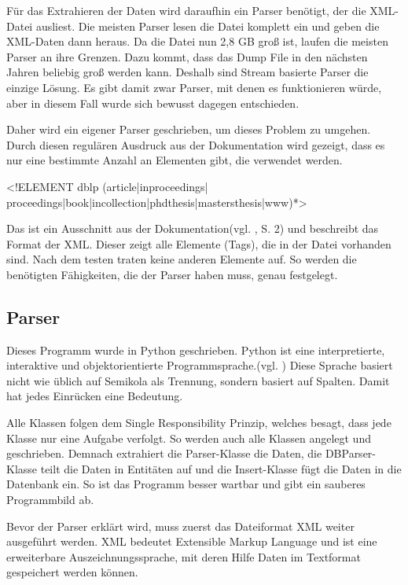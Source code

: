 Für das Extrahieren der Daten wird daraufhin ein Parser benötigt, der die XML-Datei ausliest. Die meisten Parser lesen die Datei komplett ein und geben die XML-Daten dann heraus. Da die Datei nun 2,8 GB groß ist, laufen die meisten Parser an ihre Grenzen. Dazu kommt, dass das Dump File in den nächsten Jahren beliebig groß werden kann. Deshalb sind Stream basierte Parser die einzige Lösung. Es gibt damit zwar Parser, mit denen es funktionieren würde, aber in diesem Fall wurde sich bewusst dagegen entschieden. 

Daher wird ein eigener Parser geschrieben, um dieses Problem zu umgehen. Durch diesen regulären Ausdruck aus der Dokumentation wird gezeigt, dass es nur eine bestimmte Anzahl an Elementen gibt, die verwendet werden. 

\begin{center}
	<!ELEMENT dblp (article|inproceedings| proceedings|book|incollection|phdthesis|mastersthesis|www)*>
\end{center}



Das ist ein Ausschnitt aus der Dokumentation(vgl. \cite{DBLP:journals/pvldb/Ley09}, S. 2) und beschreibt das Format der XML. Dieser zeigt alle Elemente (Tags), die in der Datei vorhanden sind. Nach dem testen traten keine anderen Elemente auf. So werden die benötigten Fähigkeiten, die der Parser haben muss, genau festgelegt. 



\subsection{Parser}

Dieses Programm wurde in Python geschrieben. Python ist eine interpretierte, interaktive und objektorientierte Programmsprache.(vgl. \cite{Pythonwasistdas}) Diese Sprache basiert nicht wie üblich auf Semikola als Trennung, sondern basiert auf Spalten. Damit hat jedes Einrücken eine Bedeutung. 

Alle Klassen folgen dem Single Responsibility Prinzip, welches besagt, dass jede Klasse nur eine Aufgabe verfolgt. So werden auch alle Klassen angelegt und geschrieben. Demnach extrahiert die Parser-Klasse die Daten, die DBParser-Klasse teilt die Daten in Entitäten auf und die Insert-Klasse fügt die Daten in die Datenbank ein. So ist das Programm besser wartbar und gibt ein sauberes Programmbild ab. 

Bevor der Parser erklärt wird, muss zuerst das Dateiformat XML weiter ausgeführt werden. XML bedeutet Extensible Markup Language und ist eine erweiterbare Auszeichnungssprache, mit deren Hilfe Daten im Textformat gespeichert werden können. 


